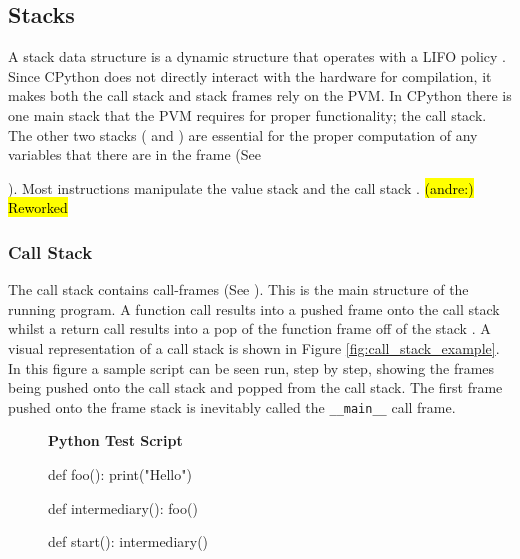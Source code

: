 \documentclass[12pt, a4paper]{report}
\DeclareRobustCommand{\andre}[1]{ {\begingroup\sethlcolor{BurntOrange}\hl{(andre:) #1}\endgroup} }
\newenvironment{code}
{\footnotesize\verbatim}{\endverbatim\normalfont}
\theoremstyle{definition}
\theoremstyle{definition}%
\theoremstyle{definition}%
\theoremstyle{definition}%
\theoremstyle{definition}%
\theoremstyle{definition}%
\begin{document}
        \subsection{Stacks}
        \label{subsec:stacks}
        \par A stack data structure is a dynamic structure that operates with a LIFO policy \cite{intro2009algorithms}. Since CPython does not directly interact with
        the hardware for compilation, it makes both the call stack and stack frames rely on the PVM. In CPython there is one main stack that the PVM requires for proper functionality; the call stack. 
        The other two stacks ( and ) are essential for the proper computation of any variables that there are in the
        frame (See {{\bfseries{}}). Most instructions manipulate the value stack and the call stack \cite{general2018stacks}.
            \andre{Reworked}
            \subsubsection*{Call Stack}
            \label{subsubsec:call_stack}
            \par The call stack contains call-frames (See {\bfseries{}}). This is the main structure of the running program.
            A function call results into a pushed frame onto the call stack whilst 
            a return call results into a pop of the function frame off of the stack \cite{call2010stack}. A visual representation of a call stack is shown in Figure \ref{fig:call_stack_example}. 
            In this figure a sample script can be seen run, step by step, showing the frames being pushed onto the call stack and popped from the call stack.
            The first frame pushed onto the frame stack is inevitably called the \lstinline|__main__| call frame.
            
            \begin{figure}
                \centering
                {\bfseries Python Test Script}
                

                \begin{code}
                def foo():
                    print("Hello")
                
                def intermediary():
                    foo()
                    
                def start():
                    intermediary()
                

\end{code}
\end{figure}}
\end{document}
